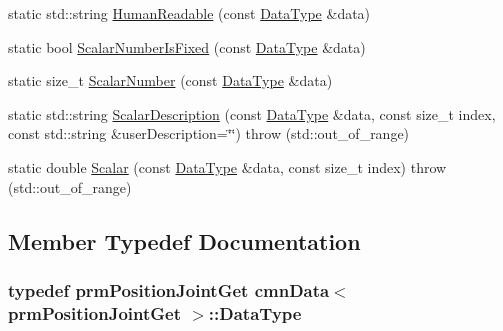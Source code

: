 \begin{DoxyCompactItemize}
\item 
static std\+::string \hyperlink{classcmn_data_3_01prm_position_joint_get_01_4_af10a289e8be91d1b609c9a3a7a4bfe3d}{Human\+Readable} (const \hyperlink{classcmn_data_3_01prm_position_joint_get_01_4_ade75e8432e51840dc4c2aa616544c2b6}{Data\+Type} \&data)
\item 
static bool \hyperlink{classcmn_data_3_01prm_position_joint_get_01_4_a377ec2239a574c2cd22b45c47cdcf8d0}{Scalar\+Number\+Is\+Fixed} (const \hyperlink{classcmn_data_3_01prm_position_joint_get_01_4_ade75e8432e51840dc4c2aa616544c2b6}{Data\+Type} \&data)
\item 
static size\+\_\+t \hyperlink{classcmn_data_3_01prm_position_joint_get_01_4_a1e0fcb63cd84dc91c8e5f75ef908c33b}{Scalar\+Number} (const \hyperlink{classcmn_data_3_01prm_position_joint_get_01_4_ade75e8432e51840dc4c2aa616544c2b6}{Data\+Type} \&data)
\item 
static std\+::string \hyperlink{classcmn_data_3_01prm_position_joint_get_01_4_a9a913cde2bce0c929999ecc4e1a83883}{Scalar\+Description} (const \hyperlink{classcmn_data_3_01prm_position_joint_get_01_4_ade75e8432e51840dc4c2aa616544c2b6}{Data\+Type} \&data, const size\+\_\+t index, const std\+::string \&user\+Description=\char`\"{}\char`\"{})  throw (std\+::out\+\_\+of\+\_\+range)
\item 
static double \hyperlink{classcmn_data_3_01prm_position_joint_get_01_4_a565b4a5d6db81e9042aa6db4cb534f6f}{Scalar} (const \hyperlink{classcmn_data_3_01prm_position_joint_get_01_4_ade75e8432e51840dc4c2aa616544c2b6}{Data\+Type} \&data, const size\+\_\+t index)  throw (std\+::out\+\_\+of\+\_\+range)
\end{DoxyCompactItemize}


\subsection{Member Typedef Documentation}
\hypertarget{classcmn_data_3_01prm_position_joint_get_01_4_ade75e8432e51840dc4c2aa616544c2b6}{}
\subsubsection[{Data\+Type}]{\setlength{\rightskip}{0pt plus 5cm}typedef {\bf prm\+Position\+Joint\+Get} {\bf cmn\+Data}$<$ {\bf prm\+Position\+Joint\+Get} $>$\+::{\bf Data\+Type}}\label{classcmn_data_3_01prm_position_joint_get_01_4_ade75e8432e51840dc4c2aa616544c2b6}


